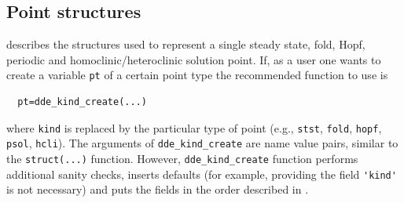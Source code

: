 \documentclass[10pt]{scrartcl}
\newcommand{\blist}[1]{\mbox{\lstinline!#1!}}
\begin{document}
\subsection{Point structures}\label{sec:point:struct}

 describes the structures used to
represent a single steady state, fold, Hopf, 
periodic and homoclinic/heteroclinic solution point. If, as a user one
wants to create a variable \blist{pt} of a certain point type the recommended function to use is
\begin{lstlisting}
  pt=dde_kind_create(...)
\end{lstlisting}
where \blist{kind} is replaced by the particular type of point (e.g.,
\blist{stst}, \blist{fold}, \blist{hopf}, \blist{psol},
\blist{hcli}). The arguments of \blist{dde_kind_create} are name value
pairs, similar to the \blist{struct(...)} function. However,
\blist{dde_kind_create} function performs additional sanity checks,
inserts defaults (for example, providing the field \blist{'kind'} is
not necessary) and puts the fields in the order described in .
\end{document}
